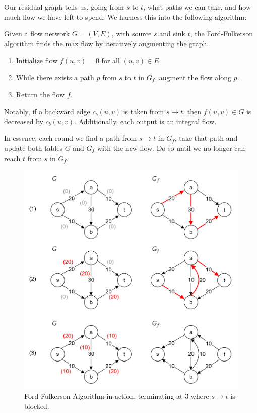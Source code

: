\noindent
Our residual graph tells us, going from $s$ to $t$, what paths we can take, and how much flow we have left to spend.
We harness this into the following algorithm:
\begin{theo}

    Given a flow network $G=(V,E)$, with source $s$ and sink $t$, the Ford-Fulkerson algorithm finds the max flow by iteratively augmenting the graph.
    \begin{enumerate}
        \item Initialize flow $f(u,v) = 0$ for all $(u,v) \in E$.
        \item While there exists a path $p$ from $s$ to $t$ in $G_f$, augment the flow along $p$.
        \item Return the flow $f$.
    \end{enumerate}

    \noindent
    Notably, if a backward edge $c_b(u,v)$ is taken from $s\to t$, then $f(u,v)\in G$ is decreased by $c_b(u,v)$.
    Additionally, each output is an integral flow.
\end{theo}
\newpage 

\noindent
In essence, each round we find a path from $s\to t$ in $G_f$, take that path and update both tables $G$ and $G_f$ with the new flow. Do 
so until we no longer can reach $t$ from $s$ in $G_f$.

\begin{figure}[h]
    \centering
    \includegraphics[width=.8\textwidth]{Sections/net/ff.png}
    \caption{Ford-Fulkerson Algorithm in action, terminating at 3 where $s\to t$ is blocked.}
\end{figure}

